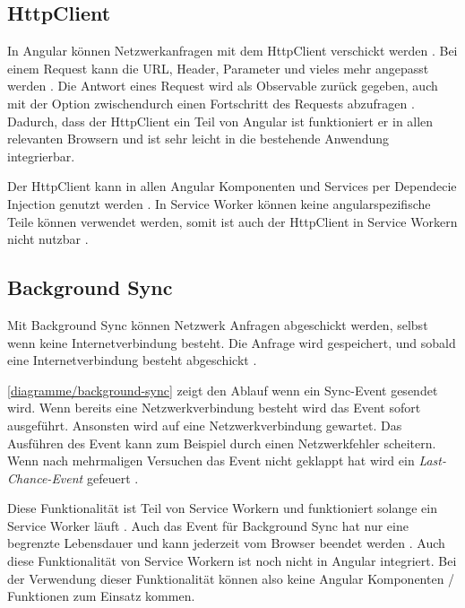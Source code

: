 \subsection{HttpClient}
In Angular können Netzwerkanfragen mit dem HttpClient verschickt werden \autocite{httpClient}. Bei einem Request kann die URL, Header, Parameter und vieles mehr angepasst werden \autocite{httpClient}. Die Antwort eines Request wird als Observable zurück gegeben, auch mit der Option zwischendurch einen Fortschritt des Requests abzufragen \autocite{httpClient}. Dadurch, dass der HttpClient ein Teil von Angular ist funktioniert er in allen relevanten Browsern und ist sehr leicht in die bestehende Anwendung integrierbar. 

Der HttpClient kann in allen Angular Komponenten und Services per Dependecie Injection genutzt werden \autocite{httpClient}. In Service Worker können keine angularspezifische Teile können verwendet werden, somit ist auch der HttpClient in Service Workern nicht nutzbar \autocite{service-worker-angular}.

\subsection{Background Sync}

Mit Background Sync können Netzwerk Anfragen abgeschickt werden, selbst wenn keine Internetverbindung besteht. Die Anfrage wird gespeichert, und sobald eine Internetverbindung besteht abgeschickt \autocite{wicg-background-sync} \autocite{Rojas2020}. 

\autoref{diagramme/background-sync} zeigt den Ablauf wenn ein Sync-Event gesendet wird. Wenn bereits eine Netzwerkverbindung besteht wird das Event sofort ausgeführt. Ansonsten wird auf eine Netzwerkverbindung gewartet. Das Ausführen des Event kann zum Beispiel durch einen Netzwerkfehler scheitern. Wenn nach mehrmaligen Versuchen das Event nicht geklappt hat wird ein \textit{Last-Chance-Event} gefeuert \autocite{Rojas2020}.

Diese Funktionalität ist Teil von Service Workern und funktioniert solange ein Service Worker läuft \autocite{wicg-background-sync}. Auch das Event für Background Sync hat nur eine begrenzte Lebensdauer und kann jederzeit vom Browser beendet werden \autocite{service-worker-spec}. Auch diese Funktionalität von Service Workern ist noch nicht in Angular integriert. Bei der Verwendung dieser Funktionalität können also keine Angular Komponenten / Funktionen zum Einsatz kommen.

